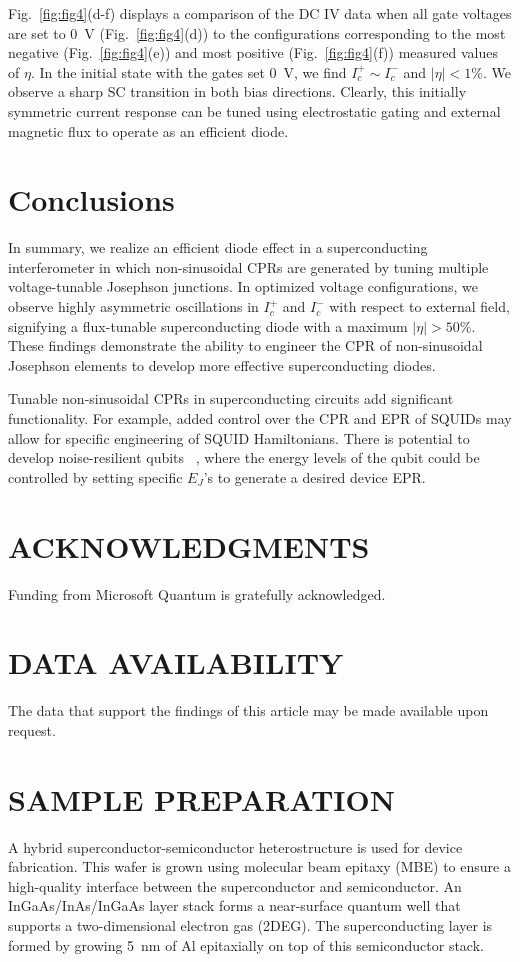\documentclass[%
 reprint,
 amsmath,amssymb,
 aps,
]{revtex4-2}
\begin{document}
Fig.~\ref{fig:fig4}(d-f) displays a comparison of the DC IV data when all gate voltages are set to $0$~V (Fig.~\ref{fig:fig4}(d)) to the configurations corresponding to the most negative (Fig.~\ref{fig:fig4}(e)) and most positive (Fig.~\ref{fig:fig4}(f)) measured values of $\eta$. In the initial state with the gates set $0$~V, we find $I_c^+ \sim I_c^-$ and $|\eta|<1\%$. We observe a sharp SC transition in both bias directions. Clearly, this initially symmetric current response can be tuned using electrostatic gating and external magnetic flux to operate as an efficient diode.

\section{Conclusions}
In summary, we realize an efficient diode effect in a superconducting interferometer in which non-sinusoidal CPRs are generated by tuning multiple voltage-tunable Josephson junctions. In optimized voltage configurations, we observe highly asymmetric oscillations in $I_c^+$ and $I_c^-$ with respect to external field, signifying a flux-tunable superconducting diode with a maximum $|\eta|>50\%$. These findings demonstrate the ability to engineer the CPR of non-sinusoidal Josephson elements to develop more effective superconducting diodes.

Tunable non-sinusoidal CPRs in superconducting circuits add significant functionality. For example, added control over the CPR and EPR of SQUIDs may allow for specific engineering of SQUID Hamiltonians. There is potential to develop noise-resilient qubits ~\cite{TransmonChargeDisp2020,SCIslandChargeDisp2020,Willsch2024,JJArrayQubit2022,Smith2020}, where the energy levels of the qubit could be controlled by setting specific $E_J$'s to generate a desired device EPR.

\section*{ACKNOWLEDGMENTS}
Funding from Microsoft Quantum is gratefully acknowledged.

\section*{DATA AVAILABILITY}
The data that support the findings of this article may be made available upon request.

\appendix
\section{SAMPLE PREPARATION}
\label{app:appA}
A hybrid superconductor-semiconductor heterostructure is used for device fabrication. This wafer is grown using molecular beam epitaxy (MBE) to ensure a high-quality interface between the superconductor and semiconductor. An InGaAs/InAs/InGaAs layer stack forms a near-surface quantum well that supports a two-dimensional electron gas (2DEG). The superconducting layer is formed by growing 5~nm of Al epitaxially on top of this semiconductor stack.
\end{document}
